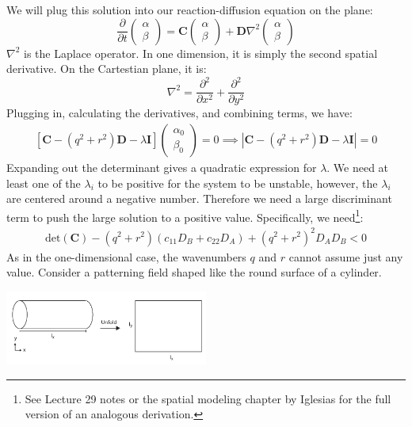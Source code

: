 \documentclass{article}
\begin{document}
We will plug this solution into our reaction-diffusion equation on the plane:
\[ \frac{\partial}{\partial t} \begin{pmatrix} \alpha\\ \beta \end{pmatrix} = \mathbf{C} \begin{pmatrix} \alpha\\ \beta \end{pmatrix} + \mathbf{D} \nabla^2 \begin{pmatrix} \alpha\\ \beta \end{pmatrix} \]
$\nabla^2$ is the Laplace operator. In one dimension, it is simply the second spatial derivative. On the Cartestian plane, it is:
\[ \nabla^2 = \frac{\partial^2}{\partial x^2} + \frac{\partial^2}{\partial y^2} \]
Plugging in, calculating the derivatives, and combining terms, we have:
\begin{eqnarray}
\left[ \mathbf{C} - \left( q^2 + r^2 \right) \mathbf{D} - \lambda \mathbf{I} \right] \begin{pmatrix} \alpha_0\\ \beta_0 \end{pmatrix} = 0 \implies \left|\mathbf{C} - \left( q^2 + r^2 \right) \mathbf{D}  - \lambda \mathbf{I} \right| = 0 \label{eqn:twodeigenvalue}
\end{eqnarray}
Expanding out the determinant gives a quadratic expression for $\lambda$. We need at least one of the $\lambda_i$ to be positive for the system to be unstable, however, the $\lambda_i$ are centered around a negative number. Therefore we need a large discriminant term to push the large solution to a positive value. Specifically, we need\footnote{See Lecture 29 notes or the spatial modeling chapter by Iglesias for the full version of an analogous derivation.}:
\begin{eqnarray}
 \textrm{det} \left( \mathbf{C} \right) - \left(q^2 + r^2 \right) \left(c_{11}D_B + c_{22} D_A \right) + \left(q^2 + r^2 \right)^2 D_A D_B < 0 \label{eqn:twod}
 \end{eqnarray}
As in the one-dimensional case, the wavenumbers $q$ and $r$ cannot assume just any value. Consider a patterning field shaped like the round surface of a cylinder.

\begin{center}
\includegraphics[width=0.5\textwidth]{geometry.pdf}
\end{center}
\end{document}
